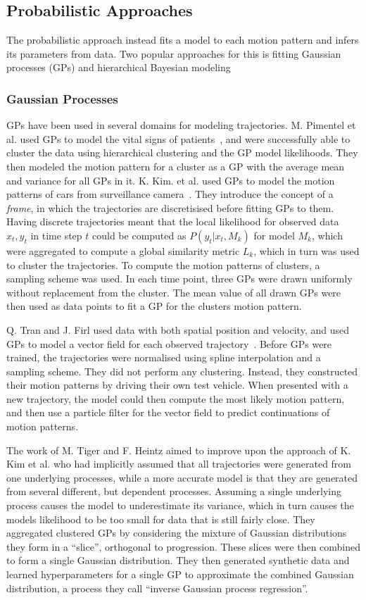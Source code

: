 \subsection{Probabilistic Approaches}
The probabilistic approach instead fits a model to each motion pattern
and infers its parameters from data. Two popular approaches for this
is fitting Gaussian processes (GPs) and hierarchical Bayesian modeling

\subsubsection{Gaussian Processes}
GPs have been used in several domains for modeling trajectories.
M. Pimentel et al. used GPs to model the vital signs of patients~\cite{Pimentel2013Sep}, 
and were successfully able to cluster the data using hierarchical clustering
and the GP model likelihoods. They then modeled the motion pattern
for a cluster as a GP with the average mean and variance for all GPs in it.
K. Kim. et al. used GPs to model the motion patterns of cars from
surveillance camera~\cite{Kim2011Nov}. They introduce the 
concept of a \textit{frame}, in which the trajectories are
discretisised before fitting GPs to them. Having discrete trajectories meant that
the local likelihood for observed data $x_t, y_t$ in time step $t$
could be computed as $P(y_t | x_t, {M_k})$ for model $M_k$, which
were aggregated to compute a global similarity metric $L_k$,
which in turn was used to cluster the trajectories. To compute the motion
patterns of clusters, a sampling scheme was used. In each time
point, three GPs were drawn uniformly without replacement from the
cluster. The mean value of all drawn GPs were then used as data points
to fit a GP for the clusters motion pattern.

Q. Tran and J. Firl used data with both spatial position and velocity,
and used GPs to model a vector field for each observed
trajectory~\cite{Tran2014Jun}. Before GPs were trained, the trajectories 
were normalised using spline interpolation and a
sampling scheme. They did not perform any clustering. Instead, they
constructed their motion patterns by driving their own test vehicle. 
When presented with a new trajectory, the model could then compute the most
likely motion pattern, and then use a particle filter for the vector
field to predict continuations of motion patterns.

The work of M. Tiger and F. Heintz aimed to improve upon the approach of K. Kim et
al. who had implicitly assumed that all trajectories were generated
from one underlying processes, while a more accurate model is
that they are generated from several different, but dependent
processes. Assuming a single underlying process causes the model to
underestimate its variance, which in turn causes the models likelihood
to be too small for data that is still fairly close.
They aggregated clustered GPs by considering the mixture of
Gaussian distributions they form in a ``slice'', orthogonal to
progression. These slices were then combined to form a single Gaussian
distribution. They then generated synthetic data and learned
hyperparameters for a single GP to approximate the combined Gaussian
distribution, a process they call ``inverse Gaussian process regression''.

